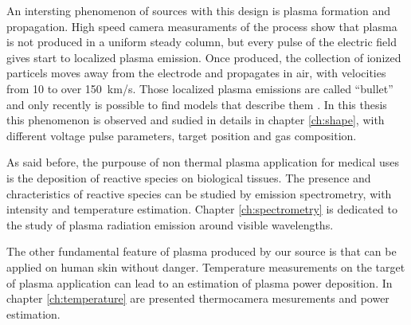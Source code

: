 An intersting phenomenon of sources with this design is plasma formation and propagation. High speed camera measuraments of the process show that plasma is not produced in a uniform steady column, but every pulse of the electric field gives start to localized plasma emission. Once produced, the collection of ionized particels moves away from the electrode and propagates in air, with velocities from \num{10} to over \SI{150}{\kilo\meter/\second}. Those localized plasma emissions are called ``bullet'' and only recently is possible to find models that describe them \cite{Lu2016DynamicsOA}.
In this thesis this phenomenon is observed and sudied in details in chapter \ref{ch:shape}, with different voltage pulse parameters, target position and gas composition.


As said before, the purpouse of non thermal plasma application for medical uses is the deposition of reactive species on biological tissues. The presence and chracteristics of reactive species can be studied by emission spectrometry, with intensity and temperature estimation. Chapter \ref{ch:spectrometry} is dedicated to the study of plasma radiation emission around visible wavelengths.


The other fundamental feature of plasma produced by our source is that can be applied on human skin without danger. Temperature measurements on the target of plasma application can lead to an estimation of plasma power deposition. In chapter \ref{ch:temperature} are presented thermocamera mesurements and power estimation.
